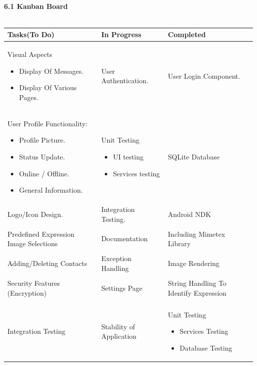 \documentclass[29pt,a4paper]{moderncv}
\begin{document}
		\\ \noindent\textbf{6.1 Kanban Board} \\
  		\\	\begin{tabular}{| p{7cm} | p{7cm} | p{7cm} |}
				\hline
		    		\textbf{Tasks(To Do)} & \textbf{In Progress} & \textbf{Completed} \\ 
   				\hline
   				\hline
		    		Visual Aspects
		    		\begin{itemize}
			    		\item Display Of Messages.
			    		\item Display Of Various Pages.
		    		\end{itemize}
		    	 	& User Authentication. & User Login Component. \\ 
   				\hline
   				\hline
	   				User Profile Functionality:
	   				\begin{itemize}
	   					\item Profile Picture.
	   					\item Status Update.
	   					\item Online / Offline.
	   					\item General Information.
	   				\end{itemize}	
	   				& Unit Testing
	   				\begin{itemize}
	   					\item UI testing
		   				\item Services testing 
	   				\end {itemize}
	   				& SQLite Database\\
   				
				Logo/Icon Design. & Integration Testing. & Android NDK\\
				
				\\Predefined Expression Image Selections & Documentation & Including Mimetex Library\\
				
				\\Adding/Deleting Contacts & Exception Handling & Image Rendering\\
				
				\\Security Features (Encryption) & Settings Page & String Handling To Identify Expression\\
				
				\\Integration Testing & Stability of Application & 
				Unit Testing
				\begin{itemize}
					\item Services Testing
					\item Database Testing
				\end{itemize}
   				

\end{tabular}
\end{document}
